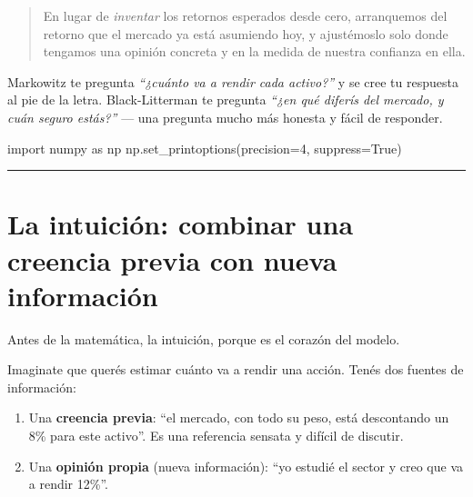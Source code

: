 \documentclass[
  spanish,
  letterpaper,
  DIV=11,
  numbers=noendperiod]{scrreprt}
\newenvironment{Shaded}{\begin{snugshade}}{\end{snugshade}}
\newcommand{\DecValTok}[1]{\textcolor[rgb]{0.68,0.00,0.00}{#1}}
\newcommand{\ImportTok}[1]{\textcolor[rgb]{0.00,0.46,0.62}{#1}}
\newcommand{\NormalTok}[1]{\textcolor[rgb]{0.00,0.23,0.31}{#1}}
\newcommand{\OperatorTok}[1]{\textcolor[rgb]{0.37,0.37,0.37}{#1}}
\newcommand{\VariableTok}[1]{\textcolor[rgb]{0.07,0.07,0.07}{#1}}
\providecommand{\tightlist}{%
  \setlength{\itemsep}{0pt}\setlength{\parskip}{0pt}}
\begin{document}
\begin{quote}
En lugar de \emph{inventar} los retornos esperados desde cero,
arranquemos del retorno que el mercado ya está asumiendo hoy, y
ajustémoslo solo donde tengamos una opinión concreta y en la medida de
nuestra confianza en ella.
\end{quote}

\begin{tcolorbox}[enhanced jigsaw, bottomrule=.15mm, colback=white, opacitybacktitle=0.6, arc=.35mm, toprule=.15mm, opacityback=0, breakable, titlerule=0mm, left=2mm, coltitle=black, colbacktitle=quarto-callout-tip-color!10!white, colframe=quarto-callout-tip-color-frame, leftrule=.75mm, toptitle=1mm, bottomtitle=1mm, title=\textcolor{quarto-callout-tip-color}{\faLightbulb}\hspace{0.5em}{La idea en una frase}, rightrule=.15mm]

Markowitz te pregunta \emph{``¿cuánto va a rendir cada activo?''} y se
cree tu respuesta al pie de la letra. Black-Litterman te pregunta
\emph{``¿en qué diferís del mercado, y cuán seguro estás?''} --- una
pregunta mucho más honesta y fácil de responder.

\end{tcolorbox}

\label{setup}
\begin{Shaded}
\begin{Highlighting}[]
\ImportTok{import}\NormalTok{ numpy }\ImportTok{as}\NormalTok{ np}
\NormalTok{np.set\_printoptions(precision}\OperatorTok{=}\DecValTok{4}\NormalTok{, suppress}\OperatorTok{=}\VariableTok{True}\NormalTok{)}
\end{Highlighting}
\end{Shaded}

\begin{center}\rule{0.5\linewidth}{0.5pt}\end{center}

\chapter{La intuición: combinar una creencia previa con nueva
información}\label{la-intuiciuxf3n-combinar-una-creencia-previa-con-nueva-informaciuxf3n}

Antes de la matemática, la intuición, porque es el corazón del modelo.

Imaginate que querés estimar cuánto va a rendir una acción. Tenés dos
fuentes de información:

\begin{enumerate}
\def\labelenumi{\arabic{enumi}.}
\tightlist
\item
  Una \textbf{creencia previa}: ``el mercado, con todo su peso, está
  descontando un 8\% para este activo''. Es una referencia sensata y
  difícil de discutir.
\item
  Una \textbf{opinión propia} (nueva información): ``yo estudié el
  sector y creo que va a rendir 12\%''.
\end{enumerate}
\end{document}
